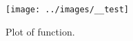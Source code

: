 \documentclass[12pt]{article}
\begin{document}
    \begin{figure}[htbp]
       \centering
       \texttt{[image: ../images/\_\_test]}
       \caption{Plot of function.}
       \label{fig:method1}
    \end{figure}
\end{document}

